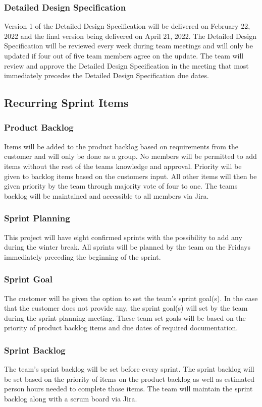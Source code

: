 \subsubsection{Detailed Design Specification}
Version 1 of the Detailed Design Specification will be delivered on February 22, 2022 and the final version being delivered on April 21, 2022. The Detailed Design Specification will be reviewed every week during team meetings and will only be updated if four out of five team members agree on the update. The team will review and approve the Detailed Design Specification in the meeting that most immediately precedes the Detailed Design Specification due dates.

\subsection{Recurring Sprint Items}
\subsubsection{Product Backlog}
Items will be added to the product backlog based on requirements from the customer and will only be done as a group. No members will be permitted to add items without the rest of the teams knowledge and approval. Priority will be given to backlog items based on the customers input. All other items will then be given priority by the team through majority vote of four to one. The teams backlog will be maintained and accessible to all members via Jira. 

\subsubsection{Sprint Planning}
This project will have eight confirmed sprints with the possibility to add any during the winter break. All sprints will be planned by the team on the Fridays immediately preceding the beginning of the sprint. 

\subsubsection{Sprint Goal}
The customer will be given the option to set the team's sprint goal(s). In the case that the customer does not provide any, the sprint goal(s) will set by the team during the sprint planning meeting. These team set goals will be based on the priority of product backlog items and due dates of required documentation.

\subsubsection{Sprint Backlog}
The team's sprint backlog will be set before every sprint. The sprint backlog will be set based on the priority of items on the product backlog as well as estimated person hours needed to complete those items. The team will maintain the sprint backlog along with a scrum board via Jira.

